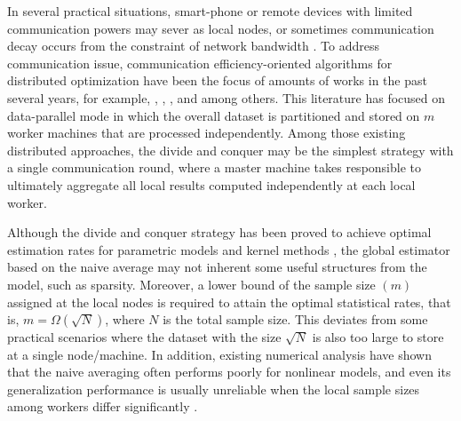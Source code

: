 \documentclass[12pt,a4paper]{article}%
\numberwithin{equation}{section}
\begin{document}
In several practical situations,  smart-phone or remote devices with limited communication powers may sever as local nodes, or sometimes communication decay  occurs from the constraint of network bandwidth  \citep{KoneMY2016}.
To address  communication issue, communication efficiency-oriented algorithms for distributed optimization have been the focus of amounts of works in the past several years, for example,
\cite{ZhangDuchiW2013}, \cite{Shamiretal2014}, \cite{WangKolarSZ2017}, \cite{JordanLeeYang2019} and among others. This literature has focused on data-parallel mode in which the overall dataset is partitioned and stored on $m$ worker machines that are processed independently.
Among those existing distributed approaches, the divide and conquer may be the simplest strategy with a single communication round, where a master machine takes responsible to ultimately aggregate all local results computed independently at each local worker.

Although the divide and conquer strategy has been proved to achieve optimal estimation rates for parametric models and kernel methods \citep*{ZhangDuchiW2013,ZhangDuchiW2015}, the global estimator based on the naive average may not inherent some useful structures from the model, such as sparsity. Moreover,   a lower bound of the sample size $(m)$ assigned at the local nodes is required to attain the optimal statistical rates, that is, $m=\Omega(\sqrt{N})$, where $N$ is the total sample size.  This  deviates from some practical scenarios where the dataset with the size $\sqrt{N}$ is also too large to store at a single node/machine.   In addition,  existing numerical analysis \citep*{JordanLeeYang2019} have shown that  the naive averaging often performs poorly for nonlinear models, and even its generalization performance  is usually unreliable when
the local sample sizes among workers differ significantly \citep{FanGuoWang2019}.
\end{document}

